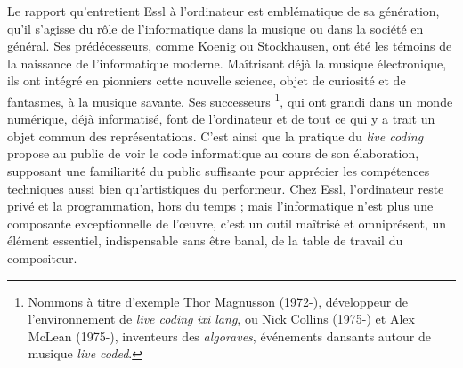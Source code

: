 \documentclass[a4paper,12pt]{article}
\begin{document}
Le rapport qu'entretient Essl à l'ordinateur est emblématique de sa génération, qu'il s'agisse du rôle de l'informatique dans la musique ou dans la société en général. Ses prédécesseurs, comme Koenig ou Stockhausen, ont été les témoins de la naissance de l'informatique moderne. Maîtrisant déjà la musique électronique, ils ont intégré en pionniers cette nouvelle science, objet de curiosité et de fantasmes, à la musique savante. Ses successeurs \footnote{Nommons à titre d'exemple Thor Magnusson (1972-), développeur de l'environnement de \emph{live coding} \emph{ixi lang}, ou Nick Collins (1975-) et Alex McLean (1975-), inventeurs des \emph{algoraves}, événements dansants autour de musique \emph{live coded}.}, qui ont grandi dans un monde numérique, déjà informatisé, font de l'ordinateur et de tout ce qui y a trait un objet commun des représentations. C'est ainsi que la pratique du \emph{live coding} propose au public de voir le code informatique au cours de son élaboration, supposant une familiarité du public suffisante pour apprécier les compétences techniques aussi bien qu'artistiques du performeur. Chez Essl, l'ordinateur reste privé et la programmation, hors du temps ; mais l'informatique n'est plus une composante exceptionnelle de l'œuvre, c'est un outil maîtrisé et omniprésent, un élément essentiel, indispensable sans être banal, de la table de travail du compositeur.
\end{document}
